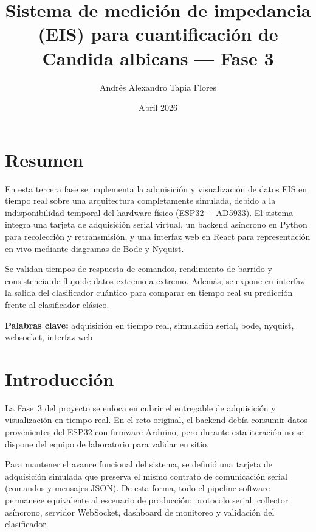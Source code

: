 \documentclass[11pt,a4paper,spanish]{book}
\title{Sistema de medici\'{o}n de impedancia (EIS) para cuantificaci\'{o}n de Candida albicans --- Fase 3}
\author{Andr\'{e}s Alexandro Tapia Flores}
\date{Abril 2026}
\begin{document}
\renewcommand{\listfigurename}{\'{I}ndice de figuras}
\renewcommand{\contentsname}{\'{I}ndice de contenidos}
\renewcommand{\figurename}{Figura}
\renewcommand{\tablename}{Tabla}
\setlength{\headheight}{26pt}

\maketitle
\frontmatter
\tableofcontents

\chapter{Resumen}
En esta tercera fase se implementa la adquisici\'{o}n y visualizaci\'{o}n de datos EIS en tiempo real sobre una arquitectura completamente simulada, debido a la indisponibilidad temporal del hardware f\'{i}sico (ESP32 + AD5933). El sistema integra una tarjeta de adquisici\'{o}n serial virtual, un backend as\'{i}ncrono en Python para recolecci\'{o}n y retransmisi\'{o}n, y una interfaz web en React para representaci\'{o}n en vivo mediante diagramas de Bode y Nyquist.

Se validan tiempos de respuesta de comandos, rendimiento de barrido y consistencia de flujo de datos extremo a extremo. Adem\'{a}s, se expone en interfaz la salida del clasificador cu\'{a}ntico para comparar en tiempo real su predicci\'{o}n frente al clasificador cl\'{a}sico.

\vspace{0.5cm}
{\bf Palabras clave:} adquisici\'{o}n en tiempo real, simulaci\'{o}n serial, bode, nyquist, websocket, interfaz web

\mainmatter

\chapter{Introducci\'{o}n}

La Fase~3 del proyecto se enfoca en cubrir el entregable de adquisici\'{o}n y visualizaci\'{o}n en tiempo real. En el reto original, el backend deb\'{i}a consumir datos provenientes del ESP32 con firmware Arduino, pero durante esta iteraci\'{o}n no se dispone del equipo de laboratorio para validar en sitio.

Para mantener el avance funcional del sistema, se defini\'{o} una tarjeta de adquisici\'{o}n simulada que preserva el mismo contrato de comunicaci\'{o}n serial (comandos y mensajes JSON). De esta forma, todo el pipeline software permanece equivalente al escenario de producci\'{o}n: protocolo serial, collector as\'{i}ncrono, servidor WebSocket, dashboard de monitoreo y validaci\'{o}n del clasificador.
\end{document}
